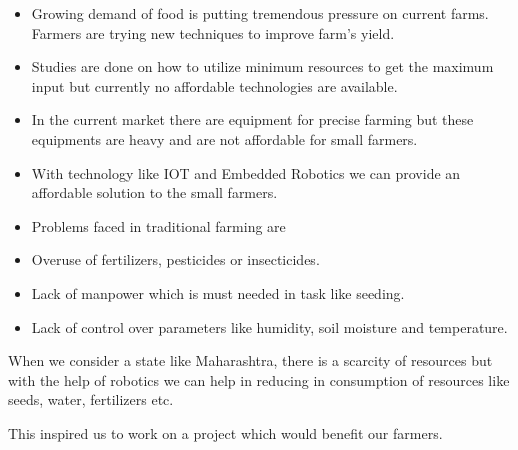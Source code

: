 \documentclass[12pt]{article}
\begin{document}
\begin{itemize}
	\item Growing demand of food is putting tremendous pressure on current farms. Farmers are trying new techniques to improve farm’s yield. \par

	\item Studies are done on how to utilize minimum resources to get the maximum input but currently no affordable technologies are available.\par

	\item In the current market there are equipment for precise farming but these equipments are heavy and are not affordable for small farmers. \par

	\item With technology like IOT and Embedded Robotics we can provide an affordable solution to the small farmers. \par

	\item Problems faced in traditional farming are 
\end{itemize}\par

\begin{itemize}
	\item Overuse of fertilizers, pesticides or insecticides.\par

	\item Lack of manpower which is must needed in task like seeding.\par

	\item Lack of control over parameters like humidity, soil moisture and temperature.\par


\end{itemize}
	\item When we consider a state like Maharashtra, there is a scarcity of resources but with the help of robotics we can help in reducing in consumption of resources like seeds, water, fertilizers etc. \par

\begin{adjustwidth}{0.5in}{0.52in}
\begin{justify}
This inspired us to work on a project which would benefit our farmers.
\end{justify}\par

\end{adjustwidth}
\end{document}
